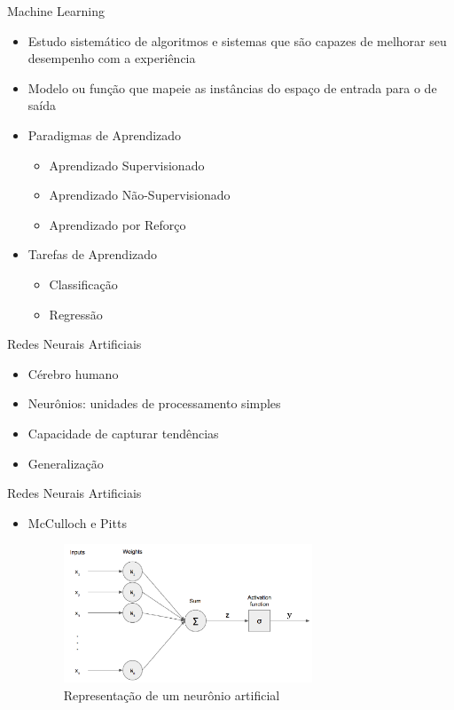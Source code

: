 \begin{frame}{Machine Learning}
   \ \  \\[0.1cm]
  \begin{itemize}
  \item Estudo sistemático de algoritmos e sistemas que são capazes de melhorar seu desempenho com a experiência
  \item Modelo ou função que mapeie as instâncias do espaço de entrada para o de saída
  \item Paradigmas de Aprendizado
  \begin{itemize}
    \item Aprendizado Supervisionado
    \item Aprendizado Não-Supervisionado
    \item Aprendizado por Reforço
  \end{itemize}
  \item Tarefas de Aprendizado
  \begin{itemize}
    \item Classificação
    \item Regressão
  \end{itemize}
\end{itemize}
\end{frame}

\begin{frame}{Redes Neurais Artificiais}
   \ \  \\[0.1cm]
  \begin{itemize}
  \item Cérebro humano
  \item Neurônios: unidades de processamento simples
  \item Capacidade de capturar tendências
  \item Generalização
\end{itemize}
\end{frame}

\begin{frame}{Redes Neurais Artificiais}
   \ \  \\[0.1cm]
  \begin{itemize}
  \item McCulloch e Pitts
  \begin{figure}[ht]
  	\centering
  	\caption{Representação de um neurônio artificial}
  	\label{fig:neuronio}
  	\includegraphics[width=0.7\textwidth]{img/perceptron.png}
  \end{figure}
\end{itemize}
\end{frame}

